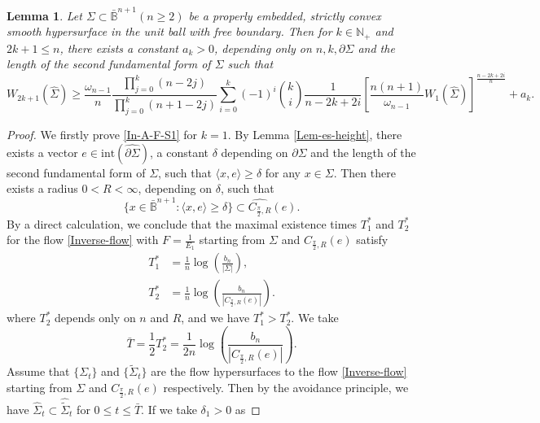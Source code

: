 \documentclass[11pt,reqno]{amsart}
\newtheorem{lem}[thm]{Lemma}
\theoremstyle{definition}
\theoremstyle{remark}
\numberwithin{equation}{section}
\renewcommand{\(}{\left(}
\renewcommand{\)}{\right)}
\renewcommand{\widetilde}{\tilde}
\renewcommand{\-}{\overline}
\begin{document}
\begin{lem}\label{In-pre}
	Let $\Sigma\subset\bar{\mathbb{B}}^{n+1} (n\geq 2)$ be a properly embedded, strictly convex smooth hypersurface in the unit ball with free boundary. Then for $k\in\mathbb{N}_{+}$ and $2k+1\leq n$, there exists a constant $a_k>0$, depending only on $n,k,\partial\Sigma$ and the length of the second fundamental form of $\Sigma$ such that 
	\begin{equation}\label{In-A-F-S1}
		W_{2k+1}(\widehat{\Sigma})\geq\frac{\omega_{n-1}}{n}\frac{\prod_{j=0}^k(n-2j)}{\prod_{j=0}^k(n+1-2j)}\sum_{i=0}^k(-1)^i\binom{k}{i}\frac{1}{n-2k+2i}\left[\frac{n(n+1)}{\omega_{n-1}}W_1(\widehat{\Sigma})\right]^{\frac{n-2k+2i}{n}}+a_k.
	\end{equation}
\end{lem}
\begin{proof}
	We firstly prove \eqref{In-A-F-S1} for $k=1$. By Lemma \ref{Lem-es-height}, there exists a vector $e\in\mathrm{int}(\widehat{\partial\Sigma})$, a constant $\delta$ depending on $\partial\Sigma$ and the length of the second fundamental form of $\Sigma$, such that $\langle x,e\rangle\geq\delta$ for any $x\in\Sigma$. Then there exists a radius $0<R<\infty$, depending on $\delta$, such that 
	\begin{equation}
		\{x\in\bar{\mathbb{B}}^{n+1}:\langle x,e\rangle\geq \delta\}\subset \widehat{C_{\frac{\pi}{2},R}}(e).
	\end{equation}
	By a direct calculation, we conclude that the maximal existence times $T_1^{*}$ and $T_2^{*}$ for the flow \eqref{Inverse-flow} with $F=\frac{1}{E_1}$ starting from $\Sigma$ and $C_{\frac{\pi}{2},R}(e)$ satisfy
	\begin{align*}
		T_1^{*}&=\frac{1}{n}\log\left(\frac{b_n}{|\Sigma|}\right),\\
		T_2^{*}&=\frac{1}{n}\log\left(\frac{b_n}{|C_{\frac{\pi}{2},R}(e)|}\right).
	\end{align*}
	where $T_2^*$ depends only on $n$ and $R$, and we have $T_1^*>T_2^*$. We take 
	\begin{equation}
		\bar{T}=\frac{1}{2}T_2^{*}=\frac{1}{2n}\log\left(\frac{b_n}{|C_{\frac{\pi}{2},R}(e)|}\right).
	\end{equation}
	Assume that $\{\Sigma_t\}$ and $\{\widetilde{\Sigma}_t\}$ are the flow hypersurfaces to the flow \eqref{Inverse-flow} starting from $\Sigma$ and $C_{\frac{\pi}{2},R}(e)$ respectively. Then by the avoidance principle, we have $\widehat{\Sigma}_t\subset\widehat{\widetilde{\Sigma}}_t$ for $0\leq t\leq \bar{T}$. If we take $\delta_1>0$ as

\end{proof}
\end{document}
